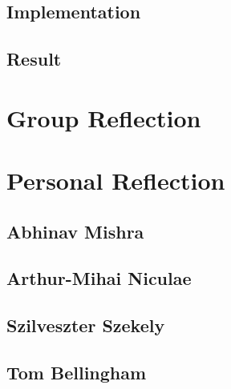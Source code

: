 \documentclass[11pt]{article}
\begin{document}
\subsection{Implementation}

\subsection{Result}

\section{Group Reflection}

\section{Personal Reflection}

\subsection{Abhinav Mishra}

\subsection{Arthur-Mihai Niculae}

\subsection{Szilveszter Szekely}

\subsection{Tom Bellingham}
\end{document}
